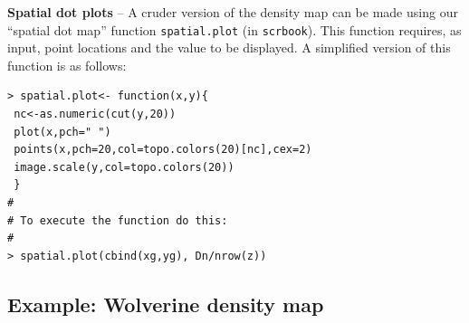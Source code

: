 {\bf Spatial dot plots } -- A cruder version of the density map can be
made using our 
``spatial dot map'' function \mbox{\tt spatial.plot} (in
\mbox{\tt scrbook}).
This function requires, as input, point 
locations and the value to be displayed. A simplified
version of this function is as follows:
\begin{verbatim}
> spatial.plot<- function(x,y){
 nc<-as.numeric(cut(y,20))
 plot(x,pch=" ")
 points(x,pch=20,col=topo.colors(20)[nc],cex=2)
 image.scale(y,col=topo.colors(20))
 }
#
# To execute the function do this:
#
> spatial.plot(cbind(xg,yg), Dn/nrow(z))
\end{verbatim}

\subsection{Example: Wolverine density map}

